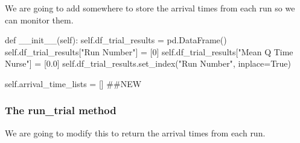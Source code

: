 \documentclass[
  letterpaper,
  DIV=11,
  numbers=noendperiod]{scrreprt}
\newenvironment{Shaded}{}{}
\newcommand{\CommentTok}[1]{\textcolor[rgb]{0.42,0.45,0.49}{#1}}
\newcommand{\DecValTok}[1]{\textcolor[rgb]{0.00,0.36,0.77}{#1}}
\newcommand{\FloatTok}[1]{\textcolor[rgb]{0.00,0.36,0.77}{#1}}
\newcommand{\FunctionTok}[1]{\textcolor[rgb]{0.44,0.26,0.76}{#1}}
\newcommand{\KeywordTok}[1]{\textcolor[rgb]{0.84,0.23,0.29}{#1}}
\newcommand{\NormalTok}[1]{\textcolor[rgb]{0.14,0.16,0.18}{#1}}
\newcommand{\OperatorTok}[1]{\textcolor[rgb]{0.14,0.16,0.18}{#1}}
\newcommand{\StringTok}[1]{\textcolor[rgb]{0.01,0.18,0.38}{#1}}
\newcommand{\VariableTok}[1]{\textcolor[rgb]{0.89,0.38,0.04}{#1}}
\begin{document}
We are going to add somewhere to store the arrival times from each run
so we can monitor them.

\begin{Shaded}
\begin{Highlighting}[]
\KeywordTok{def}  \FunctionTok{\_\_init\_\_}\NormalTok{(}\VariableTok{self}\NormalTok{):}
    \VariableTok{self}\NormalTok{.df\_trial\_results }\OperatorTok{=}\NormalTok{ pd.DataFrame()}
    \VariableTok{self}\NormalTok{.df\_trial\_results[}\StringTok{"Run Number"}\NormalTok{] }\OperatorTok{=}\NormalTok{ [}\DecValTok{0}\NormalTok{]}
    \VariableTok{self}\NormalTok{.df\_trial\_results[}\StringTok{"Mean Q Time Nurse"}\NormalTok{] }\OperatorTok{=}\NormalTok{ [}\FloatTok{0.0}\NormalTok{]}
    \VariableTok{self}\NormalTok{.df\_trial\_results.set\_index(}\StringTok{"Run Number"}\NormalTok{, inplace}\OperatorTok{=}\VariableTok{True}\NormalTok{)}

    \VariableTok{self}\NormalTok{.arrival\_time\_lists }\OperatorTok{=}\NormalTok{ [] }\CommentTok{\#\#NEW}
\end{Highlighting}
\end{Shaded}

\subsubsection{The run\_trial method}\label{the-run_trial-method-3}

We are going to modify this to return the arrival times from each run.
\end{document}
